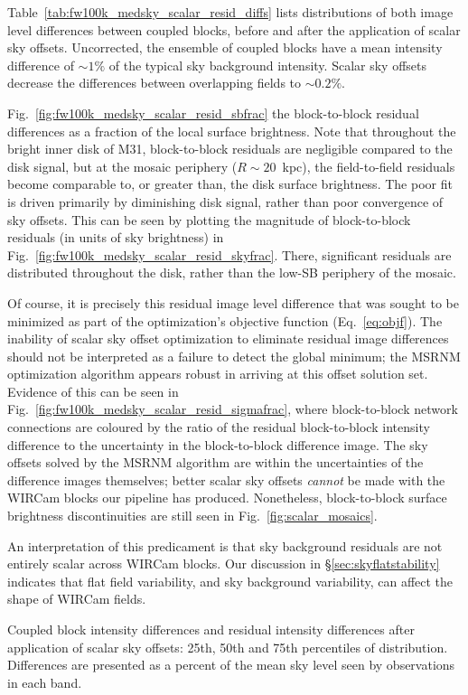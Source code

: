 \documentclass[iop]{emulateapj}
\newcommand{\Fig}[1]{Fig.~\ref{fig:#1}}  %
\newcommand{\Eq}[1]{Eq.~\ref{eq:#1}}  %
\newcommand{\Tab}[1]{Table~\ref{tab:#1}}  %
\newcommand{\Sec}[1]{\S\ref{sec:#1}}  %
\begin{document}
\Tab{fw100k_medsky_scalar_resid_diffs} lists distributions of both image level differences between coupled blocks, before and after the application of scalar sky offsets.
Uncorrected, the ensemble of coupled blocks have a mean intensity difference of $\sim 1\%$ of the typical sky background intensity.
Scalar sky offsets decrease the differences between overlapping fields to $\sim 0.2\%$.

\Fig{fw100k_medsky_scalar_resid_sbfrac} the block-to-block residual differences as a fraction of the local surface brightness.
Note that throughout the bright inner disk of M31, block-to-block residuals are negligible compared to the disk signal, but at the mosaic periphery ($R\sim 20$~kpc), the field-to-field residuals become comparable to, or greater than, the disk surface brightness.
The poor fit is driven primarily by diminishing disk signal, rather than poor convergence of sky offsets.
This can be seen by plotting the magnitude of block-to-block residuals (in units of sky brightness) in \Fig{fw100k_medsky_scalar_resid_skyfrac}.
There, significant residuals are distributed throughout the disk, rather than the low-SB periphery of the mosaic.

Of course, it is precisely this residual image level difference that was sought to be minimized as part of the optimization's objective function (\Eq{objf}).
The inability of scalar sky offset optimization to eliminate residual image differences should not be interpreted as a failure to detect the global minimum; the MSRNM optimization algorithm appears robust in arriving at this offset solution set.
Evidence of this can be seen in \Fig{fw100k_medsky_scalar_resid_sigmafrac}, where block-to-block network connections are coloured by the ratio of the residual block-to-block intensity difference to the uncertainty in the block-to-block difference image.
The sky offsets solved by the MSRNM algorithm are within the uncertainties of the difference images themselves; better scalar sky offsets \emph{cannot} be made with the WIRCam blocks our pipeline has produced.
Nonetheless, block-to-block surface brightness discontinuities are still seen in \Fig{scalar_mosaics}.

An interpretation of this predicament is that sky background residuals are not entirely scalar across WIRCam blocks.
Our discussion in \Sec{skyflatstability} indicates that flat field variability, and sky background variability, can affect the shape of WIRCam fields.

\begin{table}[t]
\centering
\caption[Coupled block differences and residual differences after
scalar sky offsets]{Coupled block intensity differences and residual intensity differences after application of scalar sky offsets: 25th, 50th and 75th percentiles of distribution.
Differences are presented as a percent of the mean sky level seen by observations in each band.
}

\label{tab:fw100k_medsky_scalar_resid_diffs}
\end{table}
\end{document}
